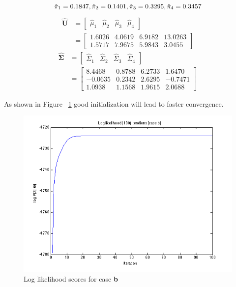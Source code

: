 \documentclass[a4paper]{article}
\begin{document}
\begin{equation}
	\hat{\pi}_1 = 0.1847, \hat{\pi}_2 = 0.1401, \hat{\pi}_3 = 0.3295, \hat{\pi}_4 = 0.3457\\
\end{equation}
\begin{align}
	\mathbf{\hat{U}} &= \begin{bmatrix}
							\hat{\mu}_1 & \hat{\mu}_2 & \hat{\mu}_3 & \hat{\mu}_4 
						\end{bmatrix} \\
					 & = \begin{bmatrix}
							1.6026  &  4.0619  &  6.9182  & 13.0263\\
						    1.5717  &  7.9675  &  5.9843  &  3.0455
						 \end{bmatrix}
\end{align}
\begin{align}
	\mathbf{\hat{\Sigma}} &= \begin{bmatrix}
								\hat{\Sigma}_1 & \hat{\Sigma}_2 & \hat{\Sigma}_3 & \hat{\Sigma}_4 
							 \end{bmatrix} \\
						  & = \begin{bmatrix}
									8.4468  &  0.8788  &  6.2733  &  1.6470 \\
								   -0.0635  &  0.2342  &  2.6295  & -0.7471 \\
								    1.0938  &  1.1568  &  1.9615  &  2.0688
						 	  \end{bmatrix}
\end{align}

As shown in Figure ~\ref{fig:log_likelihood_b} good initialization will lead to faster convergence. \\

\begin{figure}[H]
  \centering
    \includegraphics[scale=.57]{images/log_likelihood_scores_b.png}
  \caption{Log likelihood scores for case \textbf{b}}
  \label{fig:log_likelihood_b}
\end{figure}
\end{document}
